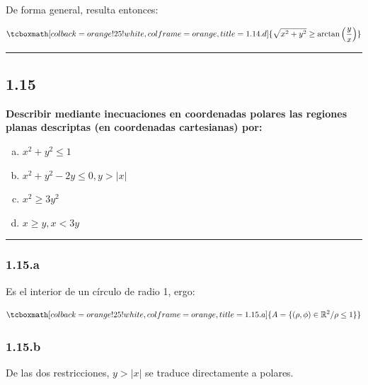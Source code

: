 \documentclass{article}
\renewcommand{\Bbb}{\mathbb}
\begin{document}
De forma general, resulta entonces:

\begin{equation}
\tcboxmath[colback=orange!25!white,colframe=orange,title=1.14.d]
{ \sqrt{x^2 + y^2} \geq \arctan \left( \frac{y}{x} \right) }
\end{equation}

\hrule
\vspace{10 pt}

\subsection*{1.15}
\label{subsec:1.15}

\textbf{Describir mediante inecuaciones en coordenadas polares las regiones planas descriptas (en coordenadas cartesianas) por:}

\begin{enumerate}[(a)]
\bfseries
\item $x^2 + y^2 \leq 1$

\item $x^2 + y^2 - 2y \leq 0, y > |x|$

\item $x^2 \geq 3y^2$

\item $x \geq y, x < 3y$
\end{enumerate}
\hrule

\subsubsection*{1.15.a}
\label{subsubsec:1.15.a}

Es el interior de un círculo de radio 1, ergo:

\begin{equation}
\tcboxmath[colback=orange!25!white,colframe=orange,title=1.15.a]
{ A = \{ (\rho, \phi) \in \Bbb R^2 / \rho \leq 1 \} }
\end{equation}

\subsubsection*{1.15.b}
\label{subsubsec:1.15.b}

De las dos restricciones, $y > |x|$ se traduce directamente a polares.
\end{document}

